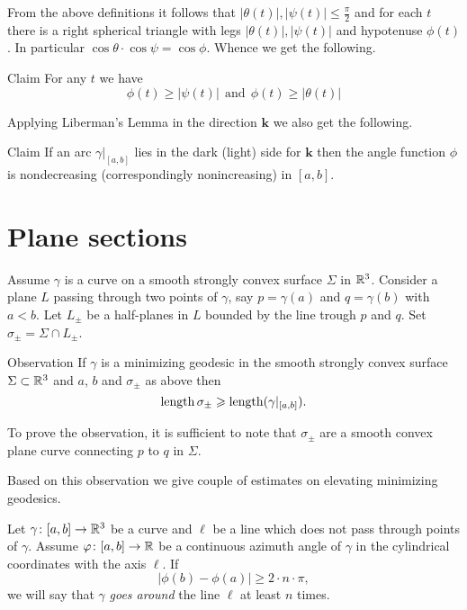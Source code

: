\documentclass[a4paper,10pt]{amsart}
\begin{document}
From the above definitions it follows that $|\theta(t)|,|\psi(t)|\le \tfrac\pi2$ and for each $t$ there is a right spherical triangle with legs $|\theta(t)|,|\psi(t)|$ and hypotenuse $\phi(t)$.
In particular $\cos\theta\cdot\cos\psi=\cos\phi$.
Whence we get the following.

\begin{thm}{Claim}\label{clm:alpha-phi-psi}
For any $t$ we have 
\[
\phi(t)\ge |\psi(t)|\ \ \text{and}\ \ \phi(t)\ge |\theta(t)|
\]

\end{thm}

Applying Liberman's Lemma in the direction $\bm{k}$ we also get the following.

\begin{thm}{Claim}
If an arc $\gamma|_{[a,b]}$ lies in the dark (light) side for $\bm{k}$ then 
the angle function $\phi$ is nondecreasing (correspondingly nonincreasing)
in $[a,b]$.
\end{thm}

\section{Plane sections}

Assume $\gamma$ is a curve on a smooth strongly convex surface $\Sigma$ in $\mathbb{R}^3$.
Consider a plane $L$ 
passing through two points of $\gamma$, 
say $p=\gamma(a)$ and $q=\gamma(b)$ with $a<b$.
Let $L_\pm$ be a  half-planes in $L$ bounded by the line trough $p$ and $q$.
Set $\sigma_\pm=\Sigma\cap L_\pm$.

\begin{thm}{Observation}\label{obs:cut}
If $\gamma$ is a minimizing geodesic in the smooth strongly convex surface $\Sigma\subset \mathbb{R}^3$ and $a$, $b$ and $\sigma_\pm$ as above then
\[\mathop{\rm length}\nolimits\sigma_\pm\geqslant\mathop{\rm length}\nolimits(\gamma|_{[a,b]}).\]
\end{thm}

To prove the observation, it is sufficient to note that $\sigma_\pm$ are a smooth convex plane curve connecting $p$ to $q$ in $\Sigma$.

Based on this observation we give couple of estimates on elevating minimizing geodesics.

Let $\gamma\colon[a,b]\to\mathbb{R}^3$ be a curve and $\ell$ be a line which does not pass through points of $\gamma$.
Assume $\varphi\colon[a,b]\to\mathbb{R}$ be a continuous azimuth angle
of $\gamma$ in the cylindrical coordinates with the axis $\ell$.
If 
\[|\phi(b)-\phi(a)|\ge 2\cdot n\cdot\pi,\]
we will say that $\gamma$ \emph{goes around} the line $\ell$
at least $n$ times.
\end{document}
